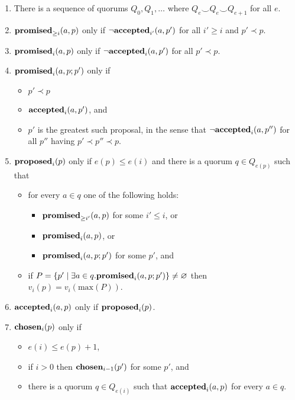 \documentclass[journal]{IEEEtran}
\begin{document}
\begin{enumerate}

\item\label{paxos-quorums} There is a sequence of quorums $Q_0, Q_1, \ldots$
where $Q_e \smile Q_e \smile Q_{e+1}$ for all $e$.

\item\label{paxos-mprom} $\mathbf{promised}_{\ge i}(a,p)$ only if $\neg\mathbf{accepted}_{i'}(a,p')$ for all
$i' \ge i$ and $p' \prec p$.

\item\label{paxos-fprom} $\mathbf{promised}_{i}(a,p)$ only if $\neg\mathbf{accepted}_{i}(a,p')$ for all
$p' \prec p$.

\item\label{paxos-bprom} $\mathbf{promised}_{i}(a,p;p')$ only if \begin{itemize} \item
$p' \prec p$ \item $\mathbf{accepted}_{i}(a,p')$, and \item $p'$ is the greatest such
proposal, in the sense that $\neg \mathbf{accepted}_{i}(a,p'')$ for all $p''$ having $p'
\prec p'' \prec p$. \end{itemize}

\item\label{paxos-prop} $\mathbf{proposed}_{i}(p)$ only if $e(p) \le e(i)$ and there is a
quorum $q \in Q_{e(p)}$ such that
\begin{itemize}
\item for every $a \in q$ one of the following holds:
%
\begin{itemize}
\item $\mathbf{promised}_{\ge i'}(a,p)$ for some $i' \le i$, or
\item $\mathbf{promised}_{i}(a,p)$, or
\item $\mathbf{promised}_{i}(a,p;p')$ for some $p'$, and
\end{itemize}

\item if $P = \{ p' \mid \exists a \in q. \mathbf{promised}_{i}(a,p;p') \}
\ne \varnothing$ then $v_i(p) = v_i(\mathrm{max}(P))$.
\end{itemize}

\item \label{paxos-acc} $\mathbf{accepted}_{i}(a,p)$ only if $\mathbf{proposed}_{i}(p)$.

\item \label{paxos-chosen} $\mathbf{chosen}_{i}(p)$ only if
\begin{itemize}
\item $e(i) \le e(p) + 1$,
\item if $i > 0$ then $\mathbf{chosen}_{i-1}(p')$ for some $p'$, and
\item there is a quorum $q \in
Q_{e(i)}$ such that $\mathbf{accepted}_{i}(a,p)$ for every $a \in q$.
\end{itemize}

\end{enumerate}
\end{document}
